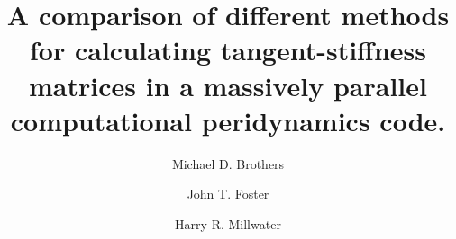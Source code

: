\documentclass[preprint,12pt]{elsarticle}
\providecommand{\DIFaddbegin}{} %
\providecommand{\DIFaddend}{} %
\providecommand{\DIFdelbegin}{} %
\providecommand{\DIFdelend}{} %
\begin{document}
\DIFaddbegin \sloppy

\DIFaddend \begin{frontmatter}


\author{Michael D. Brothers}
\author{John T. Foster}
\DIFdelbegin %

\DIFdelend \author{Harry R. Millwater\corref{}}
\address{Mechanical Engineering Department, The University of Texas at San Antonio}


\title{A comparison of different methods for calculating tangent-stiffness matrices in a massively parallel computational peridynamics code.}


\begin{abstract} %
\DIFaddbegin 


\end{abstract}
\end{frontmatter}
\end{document}
